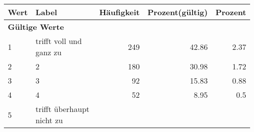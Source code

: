      \begin{longtable}{lXrrr}
     \toprule
     \textbf{Wert} & \textbf{Label} & \textbf{Häufigkeit} & \textbf{Prozent(gültig)} & \textbf{Prozent} \\
     \endhead
     \midrule
     \multicolumn{5}{l}{\textbf{Gültige Werte}}\\

     1 &
     \multicolumn{1}{X}{ trifft voll und ganz zu   } &


       \num{249} &
       \num[round-mode=places,round-precision=2]{42,86} &
         \num[round-mode=places,round-precision=2]{2,37} \\

     2 &
     \multicolumn{1}{X}{ 2   } &


       \num{180} &
       \num[round-mode=places,round-precision=2]{30,98} &
         \num[round-mode=places,round-precision=2]{1,72} \\

     3 &
     \multicolumn{1}{X}{ 3   } &


       \num{92} &
       \num[round-mode=places,round-precision=2]{15,83} &
         \num[round-mode=places,round-precision=2]{0,88} \\

     4 &
     \multicolumn{1}{X}{ 4   } &


       \num{52} &
       \num[round-mode=places,round-precision=2]{8,95} &
         \num[round-mode=places,round-precision=2]{0,5} \\

     5 &
     \multicolumn{1}{X}{ trifft überhaupt nicht zu   } &



\end{longtable}
